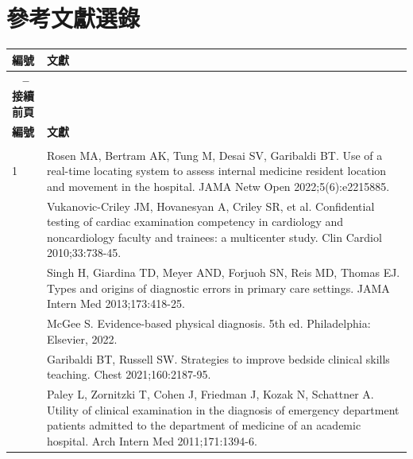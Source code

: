 \documentclass[12pt,a4paper]{article}
\begin{document}
\section{參考文獻選錄}

\begin{longtable}{>{\raggedright\arraybackslash}p{1.5cm} >{\raggedright\arraybackslash}p{13.5cm}}
\toprule
\textbf{\textcolor{emergency_red}{編號}} & \textbf{\textcolor{emergency_red}{文獻}} \\
\midrule
\endfirsthead

\multicolumn{2}{c}%
{{\bfseries \tablename\ \thetable{} -- 接續前頁}} \\
\toprule
\textbf{\textcolor{emergency_red}{編號}} & \textbf{\textcolor{emergency_red}{文獻}} \\
\midrule
\endhead

\midrule \multicolumn{2}{r}{{接續下頁}} \\ \midrule
\endfoot

\bottomrule
\endlastfoot

1 & Rosen MA, Bertram AK, Tung M, Desai SV, Garibaldi BT. Use of a real-time locating system to assess internal medicine resident location and movement in the hospital. JAMA Netw Open 2022;5(6):e2215885. \\

2 & Vukanovic-Criley JM, Hovanesyan A, Criley SR, et al. Confidential testing of cardiac examination competency in cardiology and noncardiology faculty and trainees: a multicenter study. Clin Cardiol 2010;33:738-45. \\

4 & Singh H, Giardina TD, Meyer AND, Forjuoh SN, Reis MD, Thomas EJ. Types and origins of diagnostic errors in primary care settings. JAMA Intern Med 2013;173:418-25. \\

11 & McGee S. Evidence-based physical diagnosis. 5th ed. Philadelphia: Elsevier, 2022. \\

17 & Garibaldi BT, Russell SW. Strategies to improve bedside clinical skills teaching. Chest 2021;160:2187-95. \\

19 & Paley L, Zornitzki T, Cohen J, Friedman J, Kozak N, Schattner A. Utility of clinical examination in the diagnosis of emergency department patients admitted to the department of medicine of an academic hospital. Arch Intern Med 2011;171:1394-6. \\


\end{longtable}
\end{document}
